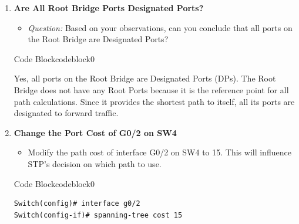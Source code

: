 \documentclass[a4paper]{book}
\begin{document}
\begin{enumerate}
\begin{ocg}{Code Block}{codeblock}{0}
	      \end{ocg}

	\item \textbf{Are All Root Bridge Ports Designated Ports?}
	      \begin{itemize}
		      \item \textit{Question:} Based on your observations, can you conclude that all ports on the Root Bridge are Designated Ports?
	      \end{itemize}


	      \begin{ocg}{Code Block}{codeblock}{0}
		      \vspace{0.5cm}
		      \begin{tcolorbox}
			      \small{
				      Yes, all ports on the Root Bridge are Designated Ports (DPs). The Root Bridge does not have any Root Ports because it is the reference point for all path calculations. Since it provides the shortest path to itself, all its ports are designated to forward traffic.
			      }
		      \end{tcolorbox}
	      \end{ocg}

	\item \textbf{Change the Port Cost of G0/2 on SW4}
	      \begin{itemize}
		      \item Modify the path cost of interface G0/2 on SW4 to 15. This will influence STP’s decision on which path to use.
	      \end{itemize}


	      \begin{ocg}{Code Block}{codeblock}{0}
		      \vspace{0.5cm}
		      \begin{lstlisting}
Switch(config)# interface g0/2
Switch(config-if)# spanning-tree cost 15

\end{lstlisting}


\end{ocg}
\end{enumerate}
\end{document}
